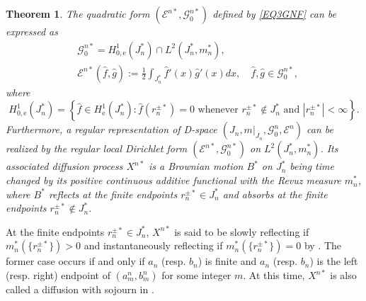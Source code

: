 \documentclass[a4paper]{amsart}
\newtheorem{theorem}{Theorem}[section]
\theoremstyle{definition}
\theoremstyle{remark}
\numberwithin{equation}{section}
\begin{document}
\begin{theorem}\label{THM313}
The quadratic form $({{\mathcal{E}}}^{n*}, \mathcal{G}^{n*}_0)$ defined by \eqref{EQ3GNF} can be expressed as
\[
\begin{aligned}
	&\mathcal{G}^{n*}_0=H^1_{0,\mathrm{e}}(J^*_n)\cap L^2(J^*_n, m^*_n),\\
	&{{\mathcal{E}}}^{n*}(\hat{f},\hat{g}):=\frac{1}{2}\int_{J^*_n}\hat{f}'(x)\hat{g}'(x)dx,\quad \hat{f},\hat{g}\in \mathcal{G}^{n*}_0,
\end{aligned}
\]
where
\[
H^1_{0,\mathrm{e}}(J^*_n)=\left\{\hat{f}\in H^1_\mathrm{e}(J^*_n): \hat{f}(r^{\pm *}_n)=0\text{ whenever }r^{\pm *}_n\notin J^*_n\text{ and }|r^{\pm *}_n|<\infty\right\}.
\]
Furthermore, a regular representation of D-space $(J_n, m|_{J_n}, \mathcal{G}^n_0, {{\mathcal{E}}}^n)$ can be realized by the regular local Dirichlet form $({{\mathcal{E}}}^{n*}, \mathcal{G}^{n*}_0)$ on $L^2(J^*_n, m^*_n)$. Its associated diffusion process $X^{n*}$ is a Brownian motion $B^*$ on $J^*_n$ being time changed by its positive continuous additive functional with the Revuz measure $m^*_n$, where $B^*$ reflects at the finite endpoints $r^{\pm *}_n\in J^*_n$ and absorbs at the finite endpoints $r^{\pm *}_n\notin J^*_n$.
\end{theorem}

At the finite endpoints $r^{\pm *}_n\in J^*_n$, $X^{n*}$ is said to be slowly reflecting if $m^*_n(\{r^{\pm *}_n\})>0$ and instantaneously reflecting if $m^*_n(\{r^{\pm *}_n\})=0$ by \cite[Chapter~VII~(3.11)]{RY99}. The former case occurs if and only if $a_n$ (resp. $b_n$) is finite and $a_n$ (resp. $b_n$) is the left (resp. right) endpoint of $(a^n_m,b^n_m)$ for some integer $m$. At this time, $X^{n*}$ is also called a diffusion with sojourn in \cite{F14}.
\end{document}
